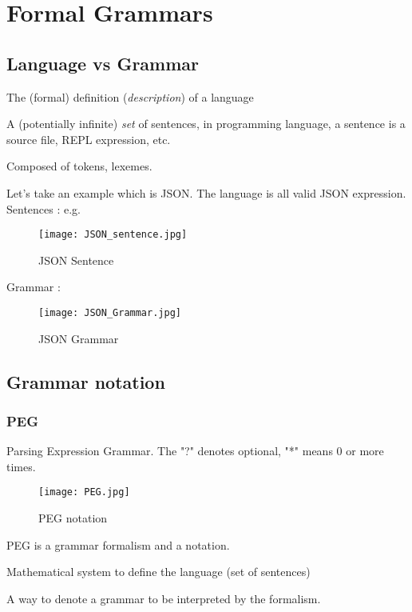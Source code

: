 \chapter{Formal Grammars}
\label{chap:formal_grammars}
\section{Language vs Grammar}
    \theoremstyle{definition}
    \begin{definition}[Grammar]
        The (formal) definition (\textit{description}) of a language
    \end{definition}
    \theoremstyle{definition}
    \begin{definition}[Language]
        A (potentially infinite) \textit{set} of sentences, in programming language, a
        sentence is a source file, REPL expression, etc.
    \end{definition}
    \theoremstyle{definition}
    \begin{definition}[Alphabet]
        Composed of tokens, lexemes.
    \end{definition}

    Let's take an example which is JSON.  The language is all valid JSON
    expression.
    Sentences : e.g. 
    \begin{figure}[H]
         \centering
         \texttt{[image: JSON\_sentence.jpg]}
         \caption{JSON Sentence}
         \label{fig:json_sentence}
    \end{figure}
    Grammar : 
    \begin{figure}[H]
         \centering
         \texttt{[image: JSON\_Grammar.jpg]}
         \caption{JSON Grammar}
         \label{fig:json_grammar}
    \end{figure}
\section{Grammar notation}
    \subsection{PEG}
        Parsing Expression Grammar. The "?" denotes optional, "*" means 0 or more
        times.
        \begin{figure}[H]
             \centering
             \texttt{[image: PEG.jpg]}
             \caption{PEG notation}
             \label{fig:label}
        \end{figure}
        PEG is a grammar formalism and a notation.
        \theoremstyle{definition}
        \begin{definition}[Formalism]
            Mathematical system to define the language (set of sentences)
        \end{definition}
        \theoremstyle{definition}
        \begin{definition}[Notation]
            A way to denote a grammar to be interpreted by the formalism.
        \end{definition}
